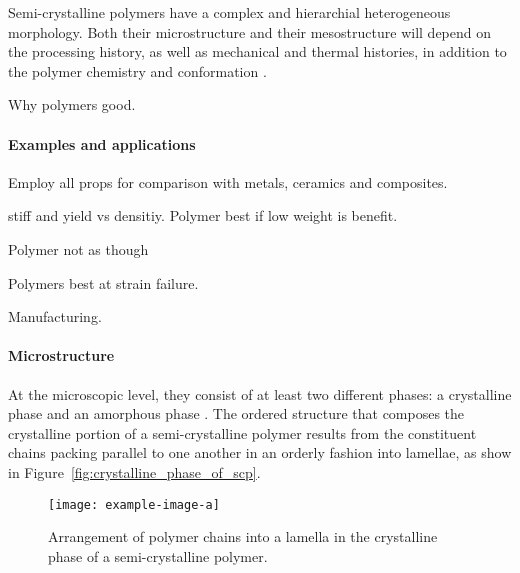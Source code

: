 Semi-crystalline polymers have a complex and hierarchial heterogeneous morphology.
Both their microstructure and their mesostructure will depend on the processing history, as well as mechanical and thermal histories, in addition to the polymer chemistry and conformation \citep{khouryMorphologyCrystallineSynthetic1976,cangemiTwoPhaseModelMechanical2001,hoffmanAnalysisRelaxationsPolychlorotrifluoroethylene2007}.

Why polymers good.

\paragraph{Examples and applications}

Employ all props for comparison with metals, ceramics and composites.

stiff and yield vs densitiy. Polymer best if low weight is benefit.

Polymer not as though

Polymers best at strain failure.

 Manufacturing.

\paragraph{Microstructure}
At the microscopic level, they consist of at least two different phases: a crystalline phase and an amorphous phase \citep{khouryMorphologyCrystallineSynthetic1976}.
The ordered structure that composes the crystalline portion of a semi-crystalline polymer results from the constituent chains packing parallel to one another in an orderly fashion into lamellae, as show in Figure~\eqref{fig:crystalline_phase_of_scp}.

\begin{figure}[htbp]
	\texttt{[image: example-image-a]}
	\caption{Arrangement of polymer chains into a lamella in the crystalline phase of a semi-crystalline polymer.}
\label{fig:crystalline_phase_of_scp}
\end{figure}

